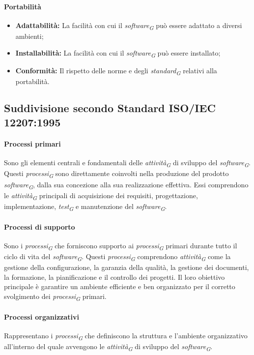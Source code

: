 \paragraph{Portabilità}
\begin{itemize}
    \item \textbf{Adattabilità:} La facilità con cui il \textit{software}\textsubscript{\textit{G}} può essere adattato a diversi ambienti;
    \item \textbf{Installabilità:} La facilità con cui il \textit{software}\textsubscript{\textit{G}} può essere installato;
    \item \textbf{Conformità:} Il rispetto delle norme e degli \textit{standard}\textsubscript{\textit{G}} relativi alla portabilità.
\end{itemize}


\subsection{Suddivisione secondo Standard ISO/IEC 12207:1995}

\paragraph{Processi primari}
Sono gli elementi centrali e fondamentali delle \textit{attività}\textsubscript{\textit{G}} di sviluppo del \textit{software}\textsubscript{\textit{G}}. Questi \textit{processi}\textsubscript{\textit{G}} sono direttamente coinvolti nella produzione del prodotto \textit{software}\textsubscript{\textit{G}}, dalla sua concezione alla sua realizzazione effettiva. Essi comprendono le \textit{attività}\textsubscript{\textit{G}} principali di acquisizione dei requisiti, progettazione, implementazione, \textit{test}\textsubscript{\textit{G}} e manutenzione del \textit{software}\textsubscript{\textit{G}}.

\paragraph{Processi di supporto}
Sono i \textit{processi}\textsubscript{\textit{G}} che forniscono supporto ai \textit{processi}\textsubscript{\textit{G}} primari durante tutto il ciclo di vita del \textit{software}\textsubscript{\textit{G}}. Questi \textit{processi}\textsubscript{\textit{G}} comprendono \textit{attività}\textsubscript{\textit{G}} come la gestione della configurazione, la garanzia della qualità, la gestione dei documenti, la formazione, la pianificazione e il controllo dei progetti. Il loro obiettivo principale è garantire un ambiente efficiente e ben organizzato per il corretto svolgimento dei \textit{processi}\textsubscript{\textit{G}} primari.

\paragraph{Processi organizzativi}
Rappresentano i \textit{processi}\textsubscript{\textit{G}} che definiscono la struttura e l'ambiente organizzativo all'interno del quale avvengono le \textit{attività}\textsubscript{\textit{G}} di sviluppo del \textit{software}\textsubscript{\textit{G}}. 
